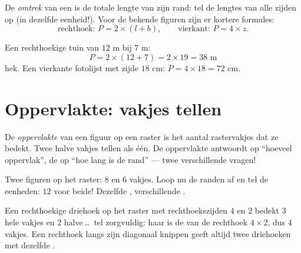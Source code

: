 \begin{definition}[Omtrek]\label{def:g4:measure:perimeter}
De \emph{omtrek} van een  is de totale lengte van zijn
rand: tel de lengtes van alle zijden op (in dezelfde eenheid!). Voor de
bekende figuren zijn er kortere formules:
\[
\text{rechthoek: } P = 2 \times (l + b),
\qquad
\text{vierkant: } P = 4 \times z .
\]
\end{definition}

\begin{example}\label{ex:g4:measure:perimeter}
Een rechthoekige tuin van $12$ m bij $7$ m:
\[
P = 2 \times (12 + 7) = 2 \times 19 = 38 \text{ m}
\]
hek. Een vierkante fotolijst met zijde $18$ cm:
$P = 4 \times 18 = 72$ cm.
\end{example}

\section{Oppervlakte: vakjes tellen}

\begin{definition}\label{def:g4:measure:area}
De \emph{oppervlakte} van een figuur op een raster is het
aantal rastervakjes dat ze bedekt. Twee halve vakjes tellen als één. De
oppervlakte antwoordt op ``hoeveel oppervlak'', de  op ``hoe lang is de
rand'' --- twee verschillende vragen!
\end{definition}

\begin{omfigure}

{\small Twee figuren op het raster:  $8$ en $6$ vakjes. Loop nu
de randen af en tel de eenheden: $12$ voor beide! Dezelfde ,
verschillende .}
\end{omfigure}

\begin{example}\label{ex:g4:measure:half}
Een rechthoekige driehoek op het raster met rechthoekszijden $4$ en $2$
bedekt $3$ hele vakjes en $2$ halve\,\dots\ tel zorgvuldig: haar 
is de  van de rechthoek $4 \times 2$, dus $4$ vakjes. Een rechthoek
langs zijn diagonaal knippen geeft altijd twee driehoeken met dezelfde
.
\end{example}


